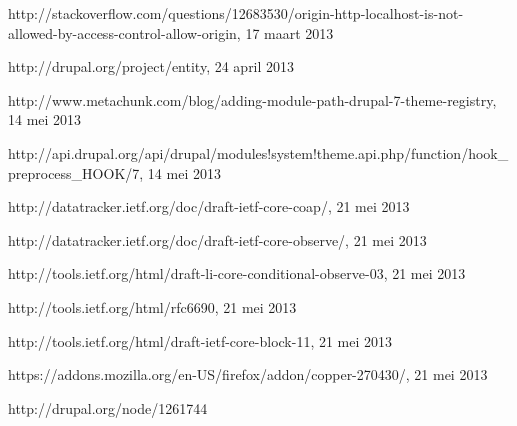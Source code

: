 \begin{thebibliography}{99}
 http://stackoverflow.com/questions/12683530/origin-http-localhost-is-not-allowed-by-access-control-allow-origin, 17 maart 2013

 http://drupal.org/project/entity, 24 april 2013

 http://www.metachunk.com/blog/adding-module-path-drupal-7-theme-registry, 14 mei 2013

 http://api.drupal.org/api/drupal/modules!system!theme.api.php/function/hook\_preprocess\_HOOK/7, 14 mei 2013

 http://datatracker.ietf.org/doc/draft-ietf-core-coap/, 21 mei 2013

 http://datatracker.ietf.org/doc/draft-ietf-core-observe/, 21 mei 2013

 http://tools.ietf.org/html/draft-li-core-conditional-observe-03, 21 mei 2013

 http://tools.ietf.org/html/rfc6690, 21 mei 2013

 http://tools.ietf.org/html/draft-ietf-core-block-11, 21 mei 2013

 https://addons.mozilla.org/en-US/firefox/addon/copper-270430/, 21 mei 2013

 http://drupal.org/node/1261744

\end{thebibliography}

